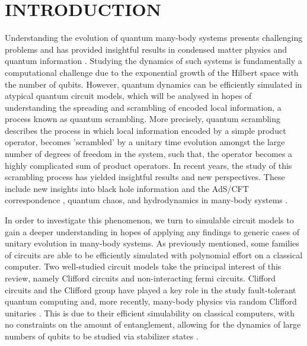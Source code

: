 \section{INTRODUCTION}
Understanding the evolution of quantum many-body systems presents challenging problems and has
provided insightful results in condensed matter physics and quantum information \cite{Polkovnikov_2011}.
Studying the dynamics of such systems is fundamentally
a computational challenge due to the exponential growth of the Hilbert space with the number of
qubits. However, quantum dynamics can be efficiently simulated in atypical quantum circuit models,
which will be analysed in hopes of understanding the spreading and scrambling of encoded local information,
a process known as quantum scrambling. More precisely, quantum scrambling describes the
process in which local information encoded by a simple product operator, becomes 'scrambled' by a
unitary time evolution amongst the large number of degrees of freedom in the system, such that, the
operator becomes a highly complicated sum of product operators. In recent years, the study of this scrambling process has yielded insightful
results and new perspectives. These include new insights into black hole information and the
AdS/CFT correspondence \cite{Calabrese_2009,Jerusalem,Jensen_2016,https://doi.org/10.48550/arxiv.1802.01198,Sekino_2008,ShenkerBlackHolesButterfly2014, Nozaki_2014, Calabrese_2005},
quantum chaos, \cite{Maldacena_2016, https://doi.org/10.48550/arxiv.1412.6087} and hydrodynamics in many-body systems \cite{Khemani_2018, PhysRevX.8.021013, PhysRevX.8.031058,Grozdanov_2018}.

In order to investigate this phenomenon, we turn to simulable circuit models  to gain a deeper understanding in hopes of applying any findings
to generic cases of unitary
evolution in many-body systems. As previously mentioned, some families of circuits are able to be efficiently
simulated with polynomial effort on a classical computer. Two well-studied circuit models take the principal interest of
this review, namely Clifford circuits and non-interacting fermi circuits. Clifford circuits and the Clifford
group have played a key role in the study fault-tolerant quantum computing and, more recently, many-body physics via
random Clifford unitaries \cite{PhysRevB.98.205136, https://doi.org/10.48550/arxiv.2110.02988}.
This is due to their efficient simulability on classical computers, with no constraints on the amount of entanglement,
allowing for the dynamics of large numbers of qubits to be studied via stabilizer states \cite{https://doi.org/10.48550/arxiv.2210.10129}.

